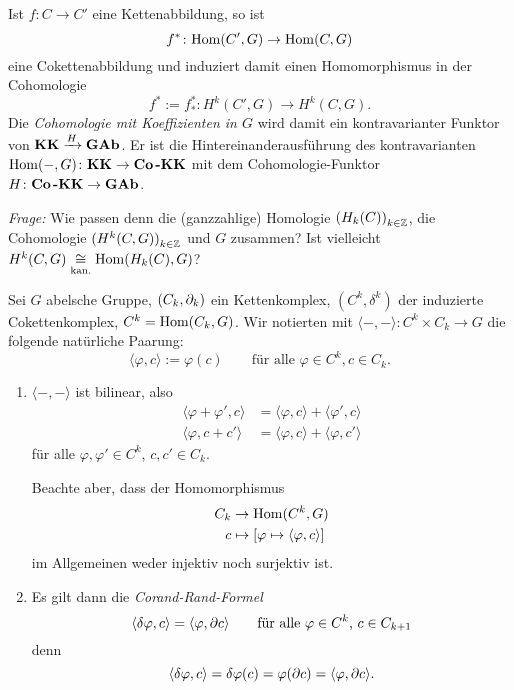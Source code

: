 \begin{kommentar}
  Ist $f\colon C \to C'$ eine Kettenabbildung, so ist
  \begin{equation*}
    f^*\colon \mathrm{Hom}(C',G) \to \mathrm{Hom}(C,G)
  \end{equation*}
  eine Cokettenabbildung und induziert damit einen Homomorphismus in der Cohomologie
  \begin{equation*}
    f^* := f_*^* \colon H^k(C',G) \to H^k(C,G).
  \end{equation*}
  Die \emph{Cohomologie mit Koeffizienten in $G$} wird damit ein kontravarianter Funktor von $\mathbf{KK} \xrightarrow{H} \mathbf{GAb}$.
  Er ist die Hintereinanderausführung des kontravarianten $\mathrm{Hom}(-,G)\colon \mathbf{KK} \to \mathbf{Co\kern1.5pt\text{\textbf-}KK}$ mit dem Cohomologie-Funktor $H\colon \mathbf{Co\kern1.5pt\text{\textbf-}KK} \to \mathbf{GAb}$.
\end{kommentar}
\emph{Frage:} Wie passen denn die (ganzzahlige) Homologie ${(H_k(C))}_{k\in\mathbb{Z}}$, die Cohomologie ${(H^k(C,G))}_{k\in\mathbb{Z}}$ und $G$ zusammen?
Ist vielleicht $H^k(C,G) \underset{\text{kan.}}{\cong} \mathrm{Hom}(H_k(C),G)$?
\begin{defn}
  Sei $G$ abelsche Gruppe, $(C_k,\partial_k)$ ein Kettenkomplex, $(C^k,\delta^k)$ der induzierte Cokettenkomplex, $C^k = \mathrm{Hom}(C_k,G)$.
  Wir notierten mit $\langle -,- \rangle \colon C^k \times C_k \to G$ die folgende natürliche Paarung:
  \begin{equation*}
    \langle \varphi,c \rangle := \varphi(c) \qquad \text{für alle } \varphi\in C^k, c \in C_k.
  \end{equation*}
\end{defn}
\begin{kommentar}
  \begin{enumerate}
    \item 
      $\langle -,- \rangle$ ist bilinear, also
      \begin{align*}
        \langle \varphi+\varphi', c \rangle & = \langle \varphi, c \rangle + \langle \varphi',c \rangle \\
        \langle \varphi, c+c' \rangle & = \langle \varphi, c \rangle + \langle \varphi,c' \rangle
      \end{align*}
      für alle $\varphi,\varphi' \in C^k$, $c,c' \in C_k$.

      Beachte aber, dass der Homomorphismus
      \begin{align*}
        C_k & \to \mathrm{Hom}(C^k,G)\\
        c   & \mapsto [ \varphi \mapsto \langle \varphi, c \rangle ]
      \end{align*}
      im Allgemeinen weder injektiv noch surjektiv ist.
    \item
      Es gilt dann die \emph{Corand-Rand-Formel}
      \begin{equation*}
        \langle \delta\varphi,c \rangle = \langle \varphi, \partial c \rangle \qquad \text{für alle $\varphi \in C^k$, $c \in C_{k+1}$}
      \end{equation*}
      denn
      \begin{equation*}
        \langle \delta\varphi, c \rangle = \delta \varphi (c) = \varphi (\partial c) = \langle \varphi, \partial c \rangle.
      \end{equation*}
  \end{enumerate}
\end{kommentar}
